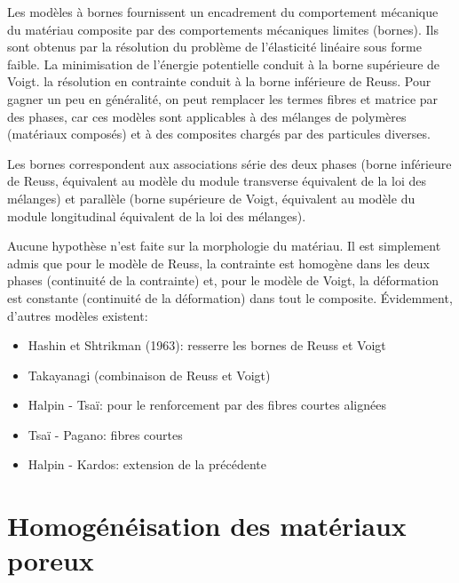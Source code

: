\medskipvm
Les modèles à bornes fournissent un encadrement du comportement mécanique du matériau composite par des comportements mécaniques limites (bornes). Ils sont obtenus par la résolution du problème de l'élasticité linéaire sous forme faible. La minimisation de l'énergie potentielle conduit à la borne supérieure de Voigt. la résolution en contrainte conduit à la borne inférieure de Reuss.
\medskipvm
Pour gagner un peu en généralité, on peut remplacer les termes fibres et matrice par des phases, car ces modèles sont applicables à des mélanges de polymères (matériaux composés)
et à des composites chargés par des particules diverses. 

Les bornes correspondent aux associations série des deux phases (borne inférieure de Reuss, équivalent au modèle du module transverse équivalent de la loi des mélanges) et parallèle (borne supérieure de Voigt, équivalent au modèle du module longitudinal équivalent de la loi des mélanges).

Aucune hypothèse n'est faite sur la morphologie du matériau. Il est simplement admis que pour le modèle de Reuss, la contrainte est homogène dans les deux phases (continuité de la contrainte) et, pour le modèle de Voigt,
la déformation est constante (continuité de la déformation) dans tout le composite. 
\medskipvm
Évidemment, d'autres modèles existent:
\begin{itemize}
	\item Hashin et Shtrikman (1963): resserre les bornes de Reuss et Voigt
	\item Takayanagi (combinaison de Reuss et Voigt)
	\item Halpin - Tsaï: pour le renforcement par des fibres courtes alignées
	\item Tsaï - Pagano: fibres courtes
	\item Halpin - Kardos: extension de la précédente
\end{itemize}

\medskip
\section{Homogénéisation des matériaux poreux}

